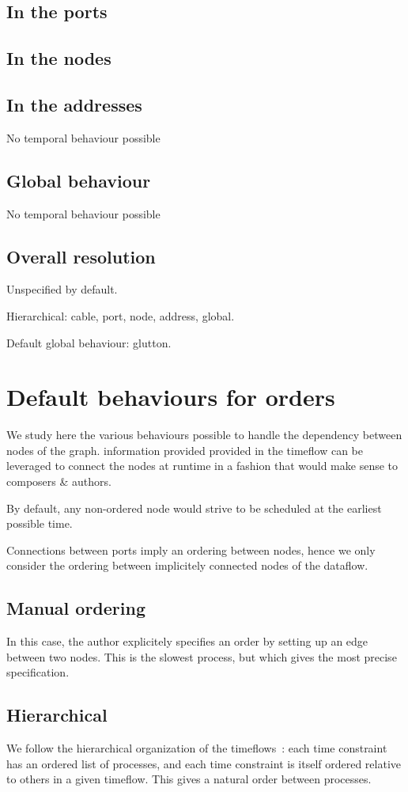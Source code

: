 \documentclass{article}
\begin{document}
    \subsection{In the ports}
    \subsection{In the nodes}
    \subsection{In the addresses}
    No temporal behaviour possible
    \subsection{Global behaviour}
    No temporal behaviour possible
    \subsection{Overall resolution}
    Unspecified by default. 
    
    Hierarchical: cable, port, node, address, global.
    
    Default global behaviour: glutton.
    
  
    \section{Default behaviours for orders}
    \label{sec.order}
    We study here the various behaviours possible to handle the dependency between nodes of the graph.
    information provided provided in the timeflow can be leveraged to connect the nodes at runtime in a fashion 
    that would make sense to composers \& authors.
    
    By default, any non-ordered node would strive to be scheduled at the earliest possible time.
    
    Connections between ports imply an ordering between nodes, hence we only consider the ordering between implicitely connected nodes of the dataflow.
    
    \subsection{Manual ordering}
    In this case, the author explicitely specifies an order by setting up an edge between two nodes. 
    This is the slowest process, but which gives the most precise specification.
    
    \subsection{Hierarchical}
    We follow the hierarchical organization of the timeflows~: each time constraint has an ordered list of processes, and each time constraint is itself ordered relative to others in a given timeflow. 
    This gives a natural order between processes.
    
\end{document}
